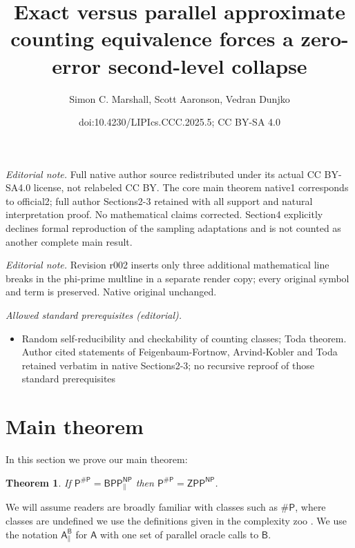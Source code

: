 \documentclass[10pt,a4paper]{article}
\title{Exact versus parallel approximate counting equivalence forces a zero-error second-level collapse}
\author{Simon C. Marshall, Scott Aaronson, Vedran Dunjko}
\date{doi:10.4230/LIPIcs.CCC.2025.5; CC BY-SA 4.0}
\newtheorem{theorem}{Theorem}
\begin{document}
\maketitle
\noindent\textit{Editorial note.} Full native author source redistributed under its actual CC BY-SA4.0 license, not relabeled CC BY. The core main theorem native1 corresponds to official2; full author Sections2-3 retained with all support and natural interpretation proof. No mathematical claims corrected. Section4 explicitly declines formal reproduction of the sampling adaptations and is not counted as another complete main result.\par\medskip
\noindent\textit{Editorial note.} Revision r002 inserts only three additional mathematical line breaks in the phi-prime multline in a separate render copy; every original symbol and term is preserved. Native original unchanged.\par\medskip
\noindent\textit{Allowed standard prerequisites (editorial).}\begin{itemize}
\item Random self-reducibility and checkability of counting classes; Toda theorem. Author cited statements of Feigenbaum-Fortnow, Arvind-Kobler and Toda retained verbatim in native Sections2-3; no recursive reproof of those standard prerequisites
\end{itemize}\medskip
\section{Main theorem}\label{sect:Approximate-exact counting theorem}
In this section we prove our main theorem:


\begin{theorem}\label{thm: main}
    If $\mathsf{P^{\# P}=BPP_{\parallel}^{NP}}$ then $\mathsf{P^{\# P}=ZPP^{NP}}$.
\end{theorem}



We will assume readers are broadly familiar with classes such as $\mathsf{\# P}$, where classes are undefined we use the definitions given in the complexity zoo \cite{zoo}. We use the notation $\mathsf{A_{\parallel}^{B}}$ for $\mathsf{A}$ with one set of parallel oracle calls to $\mathsf{B}$.
\end{document}
